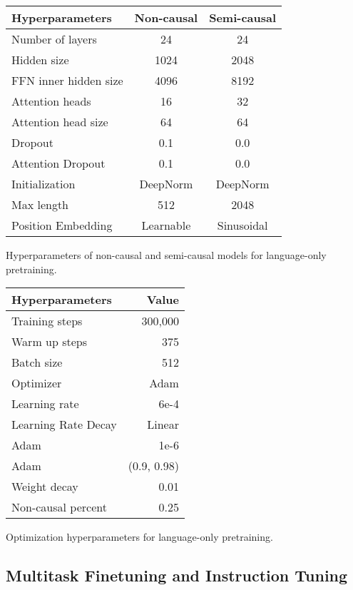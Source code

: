 \documentclass{article}
\theoremstyle{plain}
\theoremstyle{definition}
\theoremstyle{remark}
\begin{document}
\noindent\hspace{0.03\linewidth}
\begin{minipage}[c]{0.5\textwidth}
\centering
\begin{tabular}{lcc}
\toprule
\textbf{Hyperparameters} & \textbf{Non-causal} & \textbf{Semi-causal} \\ \midrule
Number of layers & 24 & 24 \\
Hidden size & 1024 & 2048 \\
FFN inner hidden size & 4096 & 8192 \\
Attention heads & 16 & 32 \\
Attention head size & 64 & 64 \\
Dropout & 0.1 & 0.0 \\
Attention Dropout & 0.1 & 0.0 \\
Initialization & DeepNorm & DeepNorm \\
Max length & 512 & 2048 \\
Position Embedding & Learnable & Sinusoidal \\
\bottomrule
\end{tabular}
\captionsetup{type=table}
\caption{Hyperparameters of non-causal and semi-causal models for language-only pretraining.}
\label{tbl:hyperparam:lang:pt:model}
\end{minipage}
\hfill
\begin{minipage}[c]{0.4\textwidth}
\centering
\begin{tabular}{lr}
\toprule
\textbf{Hyperparameters} & \textbf{Value} \\ \midrule
Training steps & 300,000 \\
Warm up steps & 375 \\
Batch size & 512 \\
Optimizer & Adam \\
Learning rate & 6e-4 \\
Learning Rate Decay & Linear \\
Adam  & 1e-6 \\
Adam  & (0.9, 0.98) \\
Weight decay & 0.01 \\
Non-causal percent & 0.25 \\
\bottomrule
\end{tabular}
\captionsetup{type=table}
\caption{Optimization hyperparameters for language-only pretraining.}
\label{tbl:hyperparam:lang:pt:opt}
\end{minipage}

\subsection{Multitask Finetuning and Instruction Tuning}
\label{app:hyperparam:lang:multi}
\end{document}
